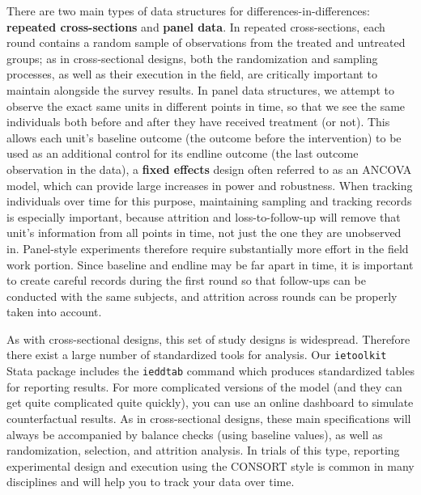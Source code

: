 There are two main types of data structures for differences-in-differences:
\textbf{repeated cross-sections} and \textbf{panel data}.
In repeated cross-sections, each round contains a random sample
of observations from the treated and untreated groups;
as in cross-sectional designs, both the randomization and sampling processes,
as well as their execution in the field,
are critically important to maintain alongside the survey results.
In panel data structures, we attempt to observe the exact same units
in different points in time, so that we see the same individuals
both before and after they have received treatment (or not).
This allows each unit's baseline outcome (the outcome before the intervention) to be used
as an additional control for its endline outcome (the last outcome observation in the data),
a \textbf{fixed effects} design often referred to as an ANCOVA model,
which can provide large increases in power and robustness.
When tracking individuals over time for this purpose,
maintaining sampling and tracking records is especially important,
because attrition and loss-to-follow-up will remove that unit's information
from all points in time, not just the one they are unobserved in.
Panel-style experiments therefore require substantially more effort
in the field work portion.
Since baseline and endline may be far apart in time,
it is important to create careful records during the first round
so that follow-ups can be conducted with the same subjects,
and attrition across rounds can be properly taken into account.

As with cross-sectional designs, this set of study designs is widespread.
Therefore there exist a large number of standardized tools for analysis.
Our \texttt{ietoolkit} Stata package includes the \texttt{ieddtab} command
which produces standardized tables for reporting results.
For more complicated versions of the model
(and they can get quite complicated quite quickly),
you can use an online dashboard to simulate counterfactual results.
As in cross-sectional designs, these main specifications
will always be accompanied by balance checks (using baseline values),
as well as randomization, selection, and attrition analysis.
In trials of this type, reporting experimental design and execution
using the CONSORT style is common in many disciplines
and will help you to track your data over time.\cite{schulz2010consort}


